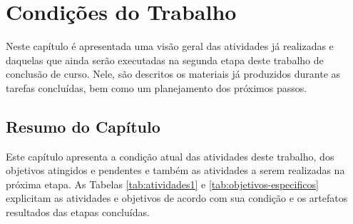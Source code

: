 \chapter{Condições do Trabalho}
\label{ch:condicoes}

Neste capítulo é apresentada uma visão geral das atividades já realizadas e daquelas que ainda serão executadas na segunda etapa deste trabalho de conclusão de curso. Nele, são descritos os materiais já produzidos durante as tarefas concluídas, bem como um planejamento dos próximos passos.







\section{Resumo do Capítulo}

Este capítulo apresenta a condição atual das atividades deste trabalho, dos objetivos atingidos e pendentes e também as atividades a serem realizadas na próxima etapa. As Tabelas \ref{tab:atividades1} e \ref{tab:objetivos-especificos} explicitam as atividades e objetivos de acordo com sua condição e os artefatos resultados das etapas concluídas.